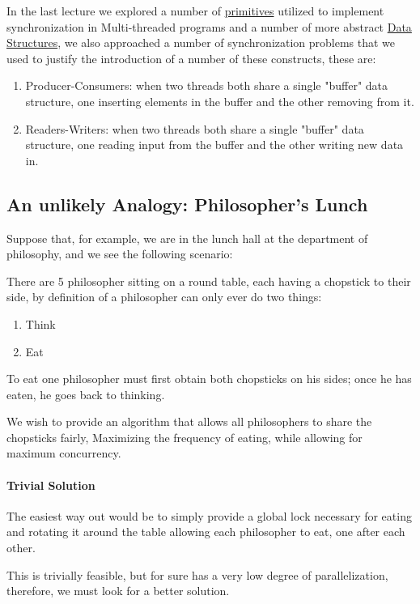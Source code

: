 \documentclass[openright, twoside]{report}
\theoremstyle{definition}
\theoremstyle{example}
\begin{document}
	In the last lecture we explored a number of \hyperref[ssec:prim]{primitives} utilized to implement synchronization in
	Multi-threaded programs and a number of more abstract \hyperref[sec:sync_struct]{Data Structures}, we also 
	approached a number of synchronization problems that we used to justify the introduction of a number of these constructs,
	these are:

	\begin{enumerate}
		\item Producer-Consumers: when two threads both share a single "buffer" data structure, one inserting elements in the buffer 
		and the other removing from it.
		\item Readers-Writers: when two threads both share a single "buffer" data structure, one reading input from the buffer
		and the other writing new data in.
	\end{enumerate}

		\subsection{An unlikely Analogy: Philosopher's Lunch}
		Suppose that, for example, we are in the lunch hall at the department of philosophy, and we see the following scenario:

		There are 5 philosopher sitting on a round table, each having a chopstick to their side, by definition of a philosopher can only
		ever do two things:
		\begin{enumerate}
			\item Think
			\item Eat
		\end{enumerate}

		To eat one philosopher must first obtain both chopsticks on his sides; once he has eaten, he goes back to thinking.

		We wish to provide an algorithm that allows all philosophers to share the chopsticks fairly, Maximizing the frequency of 
		eating, while allowing for maximum concurrency.

		\paragraph{Trivial Solution}
		The easiest way out would be to simply provide a global lock necessary for eating and rotating it around the 
		table allowing each philosopher to eat, one after each other.

		This is trivially feasible, but for sure has a very low degree of parallelization, therefore, we must look for a 
		better solution.
\end{document}
